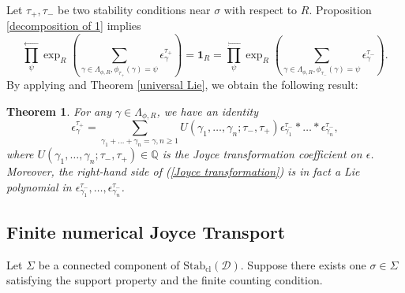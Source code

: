\documentclass[a4paper,12pt]{amsart}
\numberwithin{equation}{section}
\newtheorem{theorem}{Theorem}[section]
\newcommand{\Stab}{\mathrm{Stab}}
\newcommand{\cl}{\mathrm{cl}}
\newcommand{\1}{\mathbf{1}}
\begin{document}
Let $\tau_+,\tau_-$ be two stability conditions near $\sigma$ with respect to $R$. Proposition \ref{decomposition of 1} implies
\[\prod_\psi^\leftarrow\exp_R\left(\sum_{\gamma\in\Lambda_{\phi,R},\phi_{\tau_+}(\gamma)=\psi}\epsilon^{\tau_+}_\gamma\right)=\1_R=\prod_\psi^\leftarrow\exp_R\left(\sum_{\gamma\in\Lambda_{\phi,R},\phi_{\tau_-}(\gamma)=\psi}\epsilon^{\tau_-}_\gamma\right).\]
By applying \cite[Theorem 5.2]{Joy2008} and Theorem \ref{universal Lie}, we obtain the following result:
\begin{theorem}\label{local Joyce transformation}
    For any $\gamma\in\Lambda_{\phi,R}$, we have an identity
    \begin{equation}\label{Joyce transformation}
        \epsilon^{\tau_+}_\gamma=\sum_{\gamma_1+\dots+\gamma_n=\gamma,n\geqslant1}U(\gamma_1,\dots,\gamma_n;\tau_-,\tau_+)\epsilon^{\tau_-}_{\gamma_1}*\dots*\epsilon^{\tau_-}_{\gamma_n},
    \end{equation}
    where $U(\gamma_1,\dots,\gamma_n;\tau_-,\tau_+)\in\mathbb{Q}$ is the Joyce transformation coefficient on $\epsilon$. Moreover, the right-hand side of (\ref{Joyce transformation}) is in fact a Lie polynomial in $\epsilon^{\tau_-}_{\gamma_1},\dots,\epsilon^{\tau_-}_{\gamma_n}$.
\end{theorem}
\subsection{Finite numerical Joyce Transport}
Let $\Sigma$ be a connected component of $\Stab_\cl(\mathcal{D})$. Suppose there exists one $\sigma\in\Sigma$ satisfying the support property and the finite counting condition.
\end{document}
